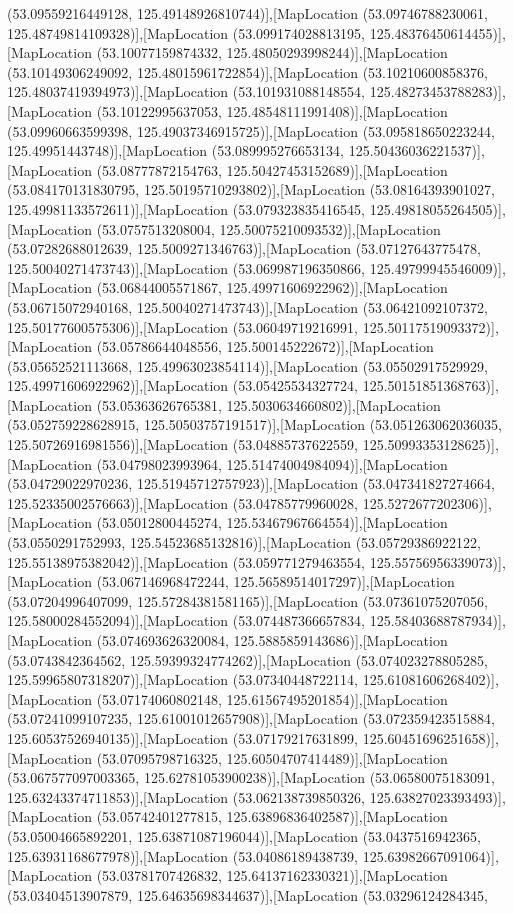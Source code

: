 (53.09559216449128, 125.49148926810744)],[MapLocation (53.09746788230061, 125.48749814109328)],[MapLocation (53.099174028813195, 125.48376450614455)],[MapLocation (53.10077159874332, 125.48050293998244)],[MapLocation (53.10149306249092, 125.48015961722854)],[MapLocation (53.10210600858376, 125.48037419394973)],[MapLocation (53.101931088148554, 125.48273453788283)],[MapLocation (53.10122995637053, 125.48548111991408)],[MapLocation (53.09960663599398, 125.49037346915725)],[MapLocation (53.095818650223244, 125.49951443748)],[MapLocation (53.089995276653134, 125.50436036221537)],[MapLocation (53.08777872154763, 125.50427453152689)],[MapLocation (53.084170131830795, 125.50195710293802)],[MapLocation (53.08164393901027, 125.49981133572611)],[MapLocation (53.079323835416545, 125.49818055264505)],[MapLocation (53.0757513208004, 125.50075210093532)],[MapLocation (53.07282688012639, 125.5009271346763)],[MapLocation (53.07127643775478, 125.50040271473743)],[MapLocation (53.069987196350866, 125.49799945546009)],[MapLocation (53.06844005571867, 125.49971606922962)],[MapLocation (53.06715072940168, 125.50040271473743)],[MapLocation (53.06421092107372, 125.50177600575306)],[MapLocation (53.06049719216991, 125.50117519093372)],[MapLocation (53.05786644048556, 125.500145222672)],[MapLocation (53.05652521113668, 125.49963023854114)],[MapLocation (53.05502917529929, 125.49971606922962)],[MapLocation (53.05425534327724, 125.50151851368763)],[MapLocation (53.05363626765381, 125.5030634660802)],[MapLocation (53.052759228628915, 125.50503757191517)],[MapLocation (53.051263062036035, 125.50726916981556)],[MapLocation (53.04885737622559, 125.50993353128625)],[MapLocation (53.04798023993964, 125.51474004984094)],[MapLocation (53.04729022970236, 125.51945712757923)],[MapLocation (53.047341827274664, 125.52335002576663)],[MapLocation (53.04785779960028, 125.5272677202306)],[MapLocation (53.05012800445274, 125.53467967664554)],[MapLocation (53.0550291752993, 125.54523685132816)],[MapLocation (53.05729386922122, 125.55138975382042)],[MapLocation (53.059771279463554, 125.55756956339073)],[MapLocation (53.067146968472244, 125.56589514017297)],[MapLocation (53.07204996407099, 125.57284381581165)],[MapLocation (53.07361075207056, 125.58000284552094)],[MapLocation (53.074487366657834, 125.58403688787934)],[MapLocation (53.074693626320084, 125.5885859143686)],[MapLocation (53.0743842364562, 125.59399324774262)],[MapLocation (53.074023278805285, 125.59965807318207)],[MapLocation (53.07340448722114, 125.61081606268402)],[MapLocation (53.07174060802148, 125.61567495201854)],[MapLocation (53.07241099107235, 125.61001012657908)],[MapLocation (53.072359423515884, 125.60537526940135)],[MapLocation (53.07179217631899, 125.60451696251658)],[MapLocation (53.07095798716325, 125.60504707414489)],[MapLocation (53.067577097003365, 125.62781053900238)],[MapLocation (53.06580075183091, 125.63243374711853)],[MapLocation (53.062138739850326, 125.63827023393493)],[MapLocation (53.05742401277815, 125.63896836402587)],[MapLocation (53.05004665892201, 125.63871087196044)],[MapLocation (53.0437516942365, 125.63931168677978)],[MapLocation (53.04086189438739, 125.63982667091064)],[MapLocation (53.03781707426832, 125.64137162330321)],[MapLocation (53.03404513907879, 125.64635698344637)],[MapLocation (53.03296124284345, 